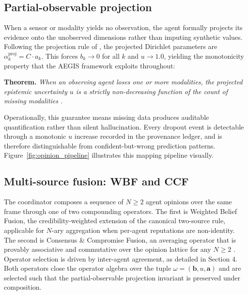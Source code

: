 \subsection{Partial-observable projection}

When a sensor or modality yields no observation, the agent formally projects its evidence onto the unobserved dimensions rather than imputing synthetic values. Following the projection rule of \citet{kaplan2015partial}, the projected Dirichlet parameters are $\alpha_k^{\text{proj}} = C \cdot a_k$. This forces $b_k \to 0$ for all $k$ and $u \to 1.0$, yielding the monotonicity property that the AEGIS framework exploits throughout:

\vspace{0.3em}
\noindent\textbf{Theorem.} \textit{When an observing agent loses one or more modalities, the projected epistemic uncertainty $u$ is a strictly non-decreasing function of the count of missing modalities \citep{kaplan2015partial, vanderheijden2018multisource}.}
\vspace{0.3em}

Operationally, this guarantee means missing data produces auditable quantification rather than silent hallucination. Every dropout event is detectable through a monotonic $u$ increase recorded in the provenance ledger, and is therefore distinguishable from confident-but-wrong prediction patterns. Figure~\ref{fig:opinion_pipeline} illustrates this mapping pipeline visually.

\subsection{Multi-source fusion: WBF and CCF}

The coordinator composes a sequence of $N \ge 2$ agent opinions over the same frame through one of two compounding operators. The first is Weighted Belief Fusion, the credibility-weighted extension of the canonical two-source rule, applicable for $N$-ary aggregation when per-agent reputations are non-identity. The second is Consensus \& Compromise Fusion, an averaging operator that is provably associative and commutative over the opinion lattice for any $N \ge 2$ \citep{vanderheijden2018multisource}. Operator selection is driven by inter-agent agreement, as detailed in Section 4. Both operators close the operator algebra over the tuple $\omega = (\mathbf{b}, u, \mathbf{a})$ and are selected such that the partial-observable projection invariant is preserved under composition.


